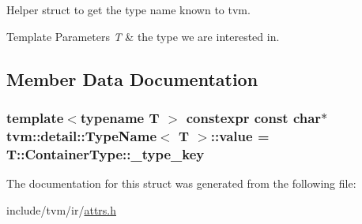 Helper struct to get the type name known to tvm. 


\begin{DoxyTemplParams}{Template Parameters}
{\em T} & the type we are interested in. \\
\hline
\end{DoxyTemplParams}


\subsection{Member Data Documentation}
\subsubsection[{\texorpdfstring{value}{value}}]{\setlength{\rightskip}{0pt plus 5cm}template$<$typename T $>$ constexpr const char$\ast$ {\bf tvm\+::detail\+::\+Type\+Name}$<$ T $>$\+::value = T\+::\+Container\+Type\+::\+\_\+type\+\_\+key\hspace{0.3cm}{\ttfamily [static]}}\hypertarget{structtvm_1_1detail_1_1TypeName_a58c1b5351ce2e7c0c7787448c18287a0}{}\label{structtvm_1_1detail_1_1TypeName_a58c1b5351ce2e7c0c7787448c18287a0}


The documentation for this struct was generated from the following file\+:\begin{DoxyCompactItemize}
\item 
include/tvm/ir/\hyperlink{ir_2attrs_8h}{attrs.\+h}\end{DoxyCompactItemize}
